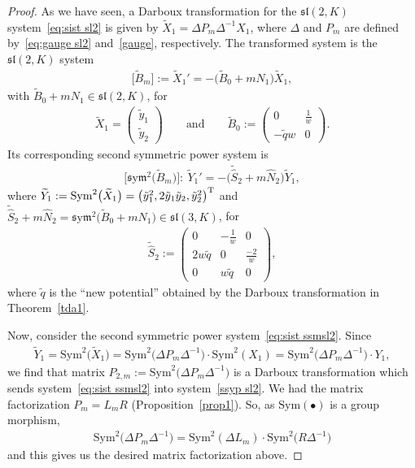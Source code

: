 \documentclass[pdftex]{sigma}%
\numberwithin{equation}{section}
\def\Sym{\mathrm{Sym}}
\def\sym{\mathfrak{s}\mathrm{y}\mathfrak{m}}
\begin{document}
\begin{proof}
As we have seen, a Darboux transformation for the $\mathfrak{sl} (2,K)$ system~\eqref{eq:sist sl2} is given by $\widetilde{X}_1 = \Delta P_m \Delta^{-1} X_1$, where $\Delta$ and $P_m$ are defined by~\eqref{eq:gauge sl2} and~\eqref{gauge}, respectively. The transformed system is the $\mathfrak{sl} (2,K)$ system
\begin{gather*}%
 \big[\widetilde{B}_{m}\big]:= \widetilde{X}_{1}'=-\big(\widetilde{B}_0+mN_1\big) \widetilde{X}_{1},
\end{gather*}
with $\widetilde{B}_0+mN_1 \in \mathfrak{sl} (2,K)$, for
\begin{gather*}
\widetilde{X}_{1} = \begin{pmatrix} \tilde{y}_1 \\ \tilde{y}_2 \end{pmatrix} \qquad \text{and} \qquad
\widetilde{B}_0:= \begin{pmatrix} 0 & \frac1w \\ -\tilde{q} w & 0 \end{pmatrix}\!.
\end{gather*}
Its corresponding second symmetric power system is
\begin{gather}\label{ssyp sl2}
\big[\sym^2 \big(\widetilde{B}_m\big)\big]\colon\ \widetilde{Y}_1'=-\big(\widetilde{\widehat{S}}_2 + m \widehat{N}_2\big) \widetilde{Y}_1,
\end{gather}
where $ \widetilde{Y}_1:= \Sym^2 \big(\widetilde{X}_1\big) = \big( \tilde{y}_1^2, 2\tilde{y}_1\tilde{y}_2 , \tilde{y}_2^2 \big)^{\rm T}$
and $\widetilde{\widehat{S}}_2 + m \widehat{N}_2 =\sym^2 \big(\widetilde{B}_0+mN_1\big) \in \mathfrak{sl} (3,K)$, for
\begin{gather*}
\widetilde{\widehat{S}}_2:=\begin{pmatrix}
0&- \frac{1}{w}&0 \\ 2 w \tilde{q} &0& \frac{-2}{w} \\ 0&w \tilde{q}&0
\end{pmatrix}\!,
\end{gather*}
where $\tilde{q}$ is the ``new potential'' obtained by the Darboux transformation in Theorem~\ref{tda1}.

Now, consider the second symmetric power system~\eqref{eq:sist ssmsl2}. Since
\begin{gather*}
\widetilde{Y}_1 = \Sym^2 \big(\widetilde{X}_1\big) = \Sym^2 \big(\Delta P_m \Delta^{-1}\big) \cdot \Sym^2 ( X_1) = \Sym^2 \big(\Delta P_m \Delta^{-1}\big) \cdot Y_1,
\end{gather*}
we find that matrix $P_{2,m}:=\Sym^2 \big(\Delta P_m \Delta^{-1}\big)$
is a Darboux transformation which sends system~\eqref{eq:sist ssmsl2} into system~\eqref{ssyp sl2}.
We had the matrix factorization $P_m=L_m R$ (Proposition~\ref{prop1}). So,
as $\Sym(\bullet)$ is a group morphism,
\begin{gather*}
\Sym^2 \big(\Delta P_m \Delta^{-1} \big) = \Sym^2(\Delta L_m)\cdot \Sym^2\big(R \Delta^{-1}\big)
 \end{gather*}
and this gives us the desired matrix factorization above.
\end{proof}
\end{document}
